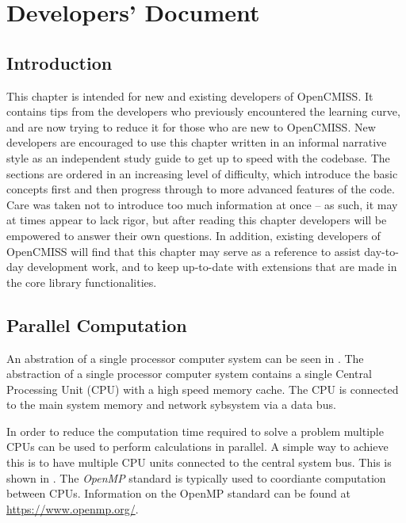 \clearemptydoublepage
\chapter{Developers' Document}
\label{cha:DevelopersDocumentation}

\section{Introduction}
\label{sec:DevelopersIntroduction}

This chapter is intended for new and existing developers of OpenCMISS. It contains tips
from the developers who previously encountered the learning curve, and are now trying to 
reduce it for those who are new to OpenCMISS. New developers are encouraged to use this
chapter written in an informal narrative style as an independent study guide to get up to 
speed with the codebase. The sections are ordered in an increasing level of difficulty,
which introduce the basic concepts first and then progress through to more advanced features 
of the code. Care was taken not to introduce too much information at once -- as such, it
may at times appear to lack rigor, but after reading this chapter developers will be 
empowered to answer their own questions. In addition, existing developers of OpenCMISS 
will find that this chapter may serve as a reference to assist day-to-day development work, 
and to keep up-to-date with extensions that are made in the core library functionalities.

\section{Parallel Computation}
\label{sec:ParallelComputation}

An abstration of a single processor computer system can be seen
in . The abstraction of a single
processor computer system contains a single Central Processing Unit
(CPU) with a high speed memory cache. The CPU is connected to the main
system memory and network sybsystem via a data bus.


In order to reduce the computation time required to solve a problem
multiple CPUs can be used to perform calculations in parallel. A
simple way to achieve this is to have multiple CPU units connected to
the central system bus. This is shown
in . The \emph{OpenMP} standard is
typically used to coordiante computation between CPUs. Information on
the OpenMP standard can be found at \url{https://www.openmp.org/}.

